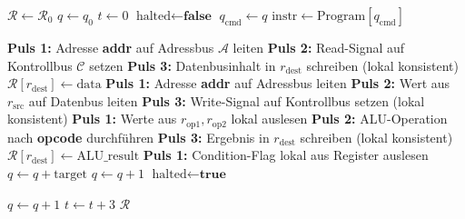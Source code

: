 \documentclass[a4paper,12pt]{article}
\theoremstyle{definition}
\begin{document}
\begin{algorithm}[H]
	\caption{LIS$^{\infty}$ Programmabarbeitungs-Algorithmus}
	\label{alg:lis_infinity}
	\begin{algorithmic}[1]
		\State $\mathcal{R} \leftarrow \mathcal{R}_0$ 
		\State $q \leftarrow q_0$ 
		\State $t \leftarrow 0$ 
		\State $\text{halted} \leftarrow \textbf{false}$
		\State $q_{\text{cmd}} \leftarrow q$ 
		\State $\text{instr} \leftarrow \text{Program}[q_{\text{cmd}}]$ 
		
		\State \textbf{Puls 1:} Adresse \textbf{addr} auf Adressbus $\mathcal{A}$ leiten
		\State \textbf{Puls 2:} Read-Signal auf Kontrollbus $\mathcal{C}$ setzen
		\State \textbf{Puls 3:} Datenbusinhalt in $r_{\text{dest}}$ schreiben (lokal konsistent)
		\State $\mathcal{R}[r_{\text{dest}}] \leftarrow \text{data}$ 
		\State \textbf{Puls 1:} Adresse \textbf{addr} auf Adressbus leiten
		\State \textbf{Puls 2:} Wert aus $r_{\text{src}}$ auf Datenbus leiten
		\State \textbf{Puls 3:} Write-Signal auf Kontrollbus setzen (lokal konsistent)
		\State \textbf{Puls 1:} Werte aus $r_{\text{op1}}, r_{\text{op2}}$ lokal auslesen
		\State \textbf{Puls 2:} ALU-Operation nach \textbf{opcode} durchführen
		\State \textbf{Puls 3:} Ergebnis in $r_{\text{dest}}$ schreiben (lokal konsistent)
		\State $\mathcal{R}[r_{\text{dest}}] \leftarrow \text{ALU\_result}$
		\State \textbf{Puls 1:} Condition-Flag lokal aus Register auslesen
		\State $q \leftarrow q + \text{target}$ 
		\Else
		\State $q \leftarrow q + 1$ 
		\EndIf
		\State $\text{halted} \leftarrow \textbf{true}$
		\EndIf
		
		\State $q \leftarrow q + 1$ 
		\State $t \leftarrow t + 3$ 
		\EndWhile
		\State \Return $\mathcal{R}$ 
		\EndProcedure
	\end{algorithmic}
\end{algorithm}
\end{document}
